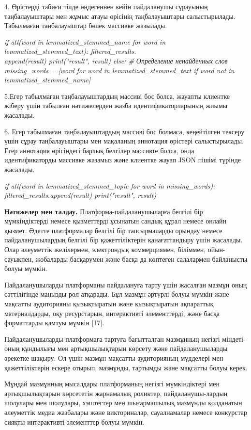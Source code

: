 \begin{multicols}{2}
4. Өрістерді табиғи тілде өңдегеннен кейін пайдаланушы сұрауының
таңбалауыштары мен жұмыс атауы өрісінің таңбалауыштары салыстырылады.
Табылмаған таңбалауыштар бөлек массивке жазылады.

\emph{if all(word in lemmatized\_stemmed\_name for word in
lemmatized\_stemmed\_text): filtered\_results.\\append(result)
print("result", result) else: \# Определение ненайденных слов
missing\_words = {[}word for word in lemmatized\_stemmed\_text if word
not in lemmatized\_stemmed\_name{]}}

5.Егер табылмаған таңбалауыштардың массиві бос болса, жауапты клиентке
жіберу үшін табылған нәтижелерден жазба идентификаторларының жиымы
жасалады.

6. Егер табылмаған таңбалауыштардың массиві бос болмаса, кеңейтілген
тексеру үшін сұрау таңбалауыштары мен мақаланың аннотация өрістері
салыстырылады. Егер аннотация өрісіндегі барлық белгілер массивте болса,
онда идентификаторды массивке жазамыз және клиентке жауап JSON пішімі
түрінде жасалады.

\emph{if all(word in lemmatized\_stemmed\_topic for word in
missing\_words): filtered\_results.append(result) print("result",
result)}

{\bfseries Нәтижелер мен талдау.} Платформа-пайдаланушыларға белгілі бір
мүмкіндіктерді немесе қызметтерді ұсынатын сандық құрал немесе онлайн
қызмет. Әдетте платформалар белгілі бір тапсырмаларды орындау немесе
пайдаланушылардың белгілі бір қажеттіліктерін қанағаттандыру үшін
жасалады. Олар әлеуметтік желілермен, электрондық коммерциямен,
біліммен, ойын-сауықпен, жобаларды басқарумен және басқа да көптеген
салалармен байланысты болуы мүмкін.

Пайдаланушыларды платформаны пайдалануға тарту үшін жасалған мазмұн оның
сәттілігінде маңызды рөл атқарады. Бұл мазмұн әртүрлі болуы мүмкін және
мақсатты аудиторияны қызықтыратын және қызықтыратын ақпараттық
материалдарды, оқу ресурстарын, интерактивті элементтерді, және басқа
форматтарды қамтуы мүмкін {[}17{]}.

Пайдаланушыларды платформаға тартуға бағытталған мазмұнның негізгі
міндеті-оның құндылығы мен артықшылықтарын көрсету және пайдаланушыларды
әрекетке шақыру. Ол үшін мазмұн мақсатты аудиторияның мүдделері мен
қажеттіліктерін ескере отырып, мазмұнды, тартымды және мақсатты болуы
керек.

Мұндай мазмұнның мысалдары платформаның негізгі мүмкіндіктері мен
артықшылықтарын көрсететін жарнамалық роликтер, пайдаланушы-лардың
шолулары мен шолулары, хэштегтер мен шығармашылық мазмұнды қолданатын
әлеуметтік медиа жазбалары және викториналар, сауалнамалар немесе
конкурстар сияқты интерактивті элементтер болуы мүмкін.


\end{multicols}

